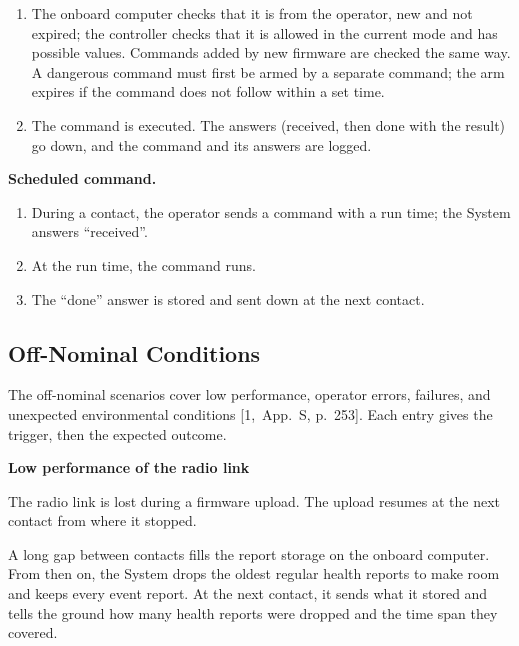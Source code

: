 \documentclass[11pt,a4paper]{article}
\begin{document}
\begin{description}[leftmargin=3cm]
\begin{enumerate}[nosep]
  \item The onboard computer checks that it is from the operator, new and not
    expired; the controller checks that it is allowed in the current mode and
    has possible values. Commands added by new firmware are checked the same
    way. A dangerous command must first be armed by a separate command; the arm
    expires if the command does not follow within a set time.
  \item The command is executed. The answers (received, then done with the
    result) go down, and the command and its answers are logged.
  \end{enumerate}
\item[Scenario-130] \textbf{Scheduled command.}
  \begin{enumerate}[nosep]
  \item During a contact, the operator sends a command with a run time; the
    System answers ``received''.
  \item At the run time, the command runs.
  \item The ``done'' answer is stored and sent down at the next contact.
  \end{enumerate}
\end{description}

\subsection{Off-Nominal Conditions}
The off-nominal scenarios cover low performance, operator errors, failures, and
unexpected environmental conditions [1,~App.~S, p.~253]. Each entry gives the
trigger, then the expected outcome.

\medskip
{}
\noindent\textbf{Low performance of the radio link}
\begin{description}[leftmargin=3cm]
\item[Scenario-200] The radio link is lost during a firmware upload. The upload
  resumes at the next contact from where it stopped.
\item[Scenario-210] A long gap between contacts fills the report storage on the
  onboard computer. From then on, the System drops the oldest regular health
  reports to make room and keeps every event report. At the next contact, it
  sends what it stored and tells the ground how many health reports were
  dropped and the time span they covered.
\end{description}
\end{document}
